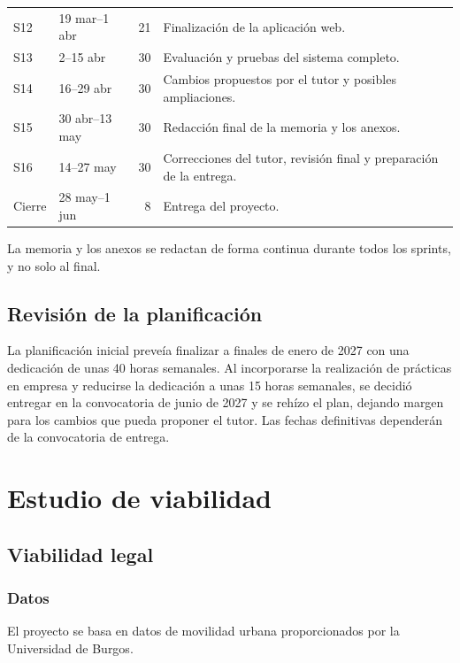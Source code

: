 \begin{longtable}{l l r p{7cm}}
S12 & 19 mar--1 abr & 21 &
Finalización de la aplicación web. \\

S13 & 2--15 abr & 30 &
Evaluación y pruebas del sistema completo. \\

S14 & 16--29 abr & 30 &
Cambios propuestos por el tutor y posibles ampliaciones. \\

S15 & 30 abr--13 may & 30 &
Redacción final de la memoria y los anexos. \\

S16 & 14--27 may & 30 &
Correcciones del tutor, revisión final y preparación de la entrega. \\

Cierre & 28 may--1 jun & 8 &
Entrega del proyecto. \\

\end{longtable}

La memoria y los anexos se redactan de forma continua durante todos los sprints, y no solo al final.

\subsection{Revisión de la planificación}

La planificación inicial preveía finalizar a finales de enero de 2027 con una dedicación de unas 40 horas semanales. Al incorporarse la realización de prácticas en empresa y reducirse la dedicación a unas 15 horas semanales, se decidió entregar en la convocatoria de junio de 2027 y se rehízo el plan, dejando margen para los cambios que pueda proponer el tutor. Las fechas definitivas dependerán de la convocatoria de entrega.

\section{Estudio de viabilidad}


\subsection{Viabilidad legal}

\subsubsection*{Datos}

El proyecto se basa en datos de movilidad urbana proporcionados por la Universidad de Burgos.

